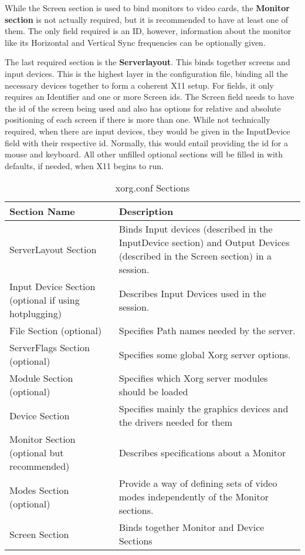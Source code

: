 \documentclass{acm_proc_article-sp}
\begin{document}
\par
While the Screen section is used to bind monitors to video cards, the \textbf{Monitor section} is not actually required, but it is recommended to have at least one of them. \cite{config}The only field required is an ID, however, information about the monitor like its Horizontal and Vertical Sync frequencies can be optionally given.
\par
The last required section is the \textbf{Serverlayout}. This binds together screens and input devices.\cite{config} This is the highest layer in the configuration file, binding all the necessary devices together to form a coherent X11 setup. For fields, it only requires an Identifier and one or more Screen ids. The Screen field needs to have the id of the screen being used and also has options for relative and absolute positioning of each screen if there is more than one. While not technically required, when there are input devices, they would be given in the InputDevice field with their respective id. Normally, this would entail providing the id for a mouse and keyboard. 
All other unfilled optional sections will be filled in with defaults, if needed, when X11 begins to run.

\begin{table}
 \centering
  \caption{xorg.conf Sections}
  \begin{tabular}{|p{4cm}|p{4cm}|} \hline
  \textbf{Section Name}&\textbf{Description}\\ \hline
 ServerLayout Section & Binds Input devices (described in the InputDevice section) and Output Devices (described in the Screen section) in a session.\\ \hline
 Input Device Section \newline (optional if using hotplugging) & Describes Input Devices used in the session.\\ \hline
 File Section (optional) & Specifies Path names needed by the server. \\ \hline
 ServerFlags Section \newline (optional) & Specifies some global Xorg server options.\\ \hline
 Module Section (optional) & Specifies which Xorg server modules should be loaded \\ \hline
 Device Section & Specifies mainly the graphics devices and the drivers needed for them\\ \hline
 Monitor Section \newline(optional but recommended) & Describes specifications about a Monitor \\ \hline
 Modes Section (optional) & Provide a way of defining sets of video modes independently of the Monitor sections.\\ \hline
 Screen Section & Binds together Monitor and Device Sections \\ \hline
\end{tabular}
\end{table}
\end{document}
